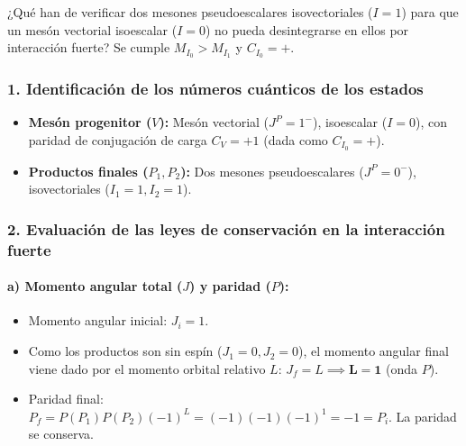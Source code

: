 \begin{problema}
¿Qué han de verificar dos mesones pseudoescalares isovectoriales ($I=1$) para que un mesón vectorial isoescalar ($I=0$) no pueda desintegrarse en ellos por interacción fuerte?
Se cumple $M_{I_0} > M_{I_1}$ y $C_{I_0} = +$.

\tcblower

\subsubsection*{1. Identificación de los números cuánticos de los estados}

\begin{itemize}
    \item \textbf{Mesón progenitor ($V$):} Mesón vectorial ($J^P = 1^-$), isoescalar ($I = 0$), con paridad de conjugación de carga $C_V = +1$ (dada como $C_{I_0} = +$).
    \item \textbf{Productos finales ($P_1, P_2$):} Dos mesones pseudoescalares ($J^P = 0^-$), isovectoriales ($I_1 = 1, I_2 = 1$).
\end{itemize}

\subsubsection*{2. Evaluación de las leyes de conservación en la interacción fuerte}

\paragraph{a) Momento angular total ($J$) y paridad ($P$):}
\begin{itemize}
    \item Momento angular inicial: $J_i = 1$.
    \item Como los productos son sin espín ($J_1=0, J_2=0$), el momento angular final viene dado por el momento orbital relativo $L$: $J_f = L \implies \mathbf{L = 1}$ (onda $P$).
    \item Paridad final: $P_f = P(P_1) P(P_2) (-1)^L = (-1)(-1)(-1)^1 = -1 = P_i$. La paridad se conserva.
\end{itemize}


\end{problema}
